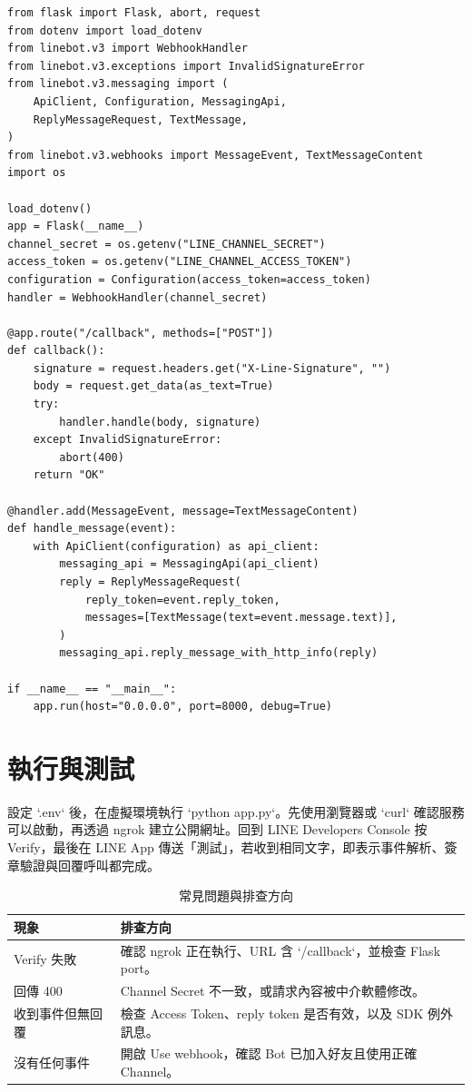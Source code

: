 \begin{lstlisting}[caption={Python Echo Bot 核心程式},label={lst:app-core}]
from flask import Flask, abort, request
from dotenv import load_dotenv
from linebot.v3 import WebhookHandler
from linebot.v3.exceptions import InvalidSignatureError
from linebot.v3.messaging import (
    ApiClient, Configuration, MessagingApi,
    ReplyMessageRequest, TextMessage,
)
from linebot.v3.webhooks import MessageEvent, TextMessageContent
import os

load_dotenv()
app = Flask(__name__)
channel_secret = os.getenv("LINE_CHANNEL_SECRET")
access_token = os.getenv("LINE_CHANNEL_ACCESS_TOKEN")
configuration = Configuration(access_token=access_token)
handler = WebhookHandler(channel_secret)

@app.route("/callback", methods=["POST"])
def callback():
    signature = request.headers.get("X-Line-Signature", "")
    body = request.get_data(as_text=True)
    try:
        handler.handle(body, signature)
    except InvalidSignatureError:
        abort(400)
    return "OK"

@handler.add(MessageEvent, message=TextMessageContent)
def handle_message(event):
    with ApiClient(configuration) as api_client:
        messaging_api = MessagingApi(api_client)
        reply = ReplyMessageRequest(
            reply_token=event.reply_token,
            messages=[TextMessage(text=event.message.text)],
        )
        messaging_api.reply_message_with_http_info(reply)

if __name__ == "__main__":
    app.run(host="0.0.0.0", port=8000, debug=True)
\end{lstlisting}

\section{執行與測試}
設定 `.env` 後，在虛擬環境執行 `python app.py`。先使用瀏覽器或 `curl` 確認服務可以啟動，再透過 ngrok 建立公開網址。回到 LINE Developers Console 按 Verify，最後在 LINE App 傳送「測試」，若收到相同文字，即表示事件解析、簽章驗證與回覆呼叫都完成。

\begin{table}[H]
    \centering
    \caption{常見問題與排查方向}
    \label{tab:troubleshooting}
    \begin{tabular}{p{}p{}}
        \toprule
        現象 & 排查方向 \\
        \midrule
        Verify 失敗 & 確認 ngrok 正在執行、URL 含 `/callback`，並檢查 Flask port。 \\
        回傳 400 & Channel Secret 不一致，或請求內容被中介軟體修改。 \\
        收到事件但無回覆 & 檢查 Access Token、reply token 是否有效，以及 SDK 例外訊息。 \\
        沒有任何事件 & 開啟 Use webhook，確認 Bot 已加入好友且使用正確 Channel。 \\
        \bottomrule
    \end{tabular}
\end{table}
